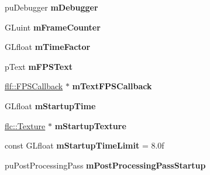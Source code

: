 \begin{DoxyCompactItemize}
\item 
pu\+Debugger {\bfseries m\+Debugger}\hypertarget{structflw_1_1Engine_1_1EngineImpl_af821555a9e1ba1352c6c9af5ba53c25d}{}\label{structflw_1_1Engine_1_1EngineImpl_af821555a9e1ba1352c6c9af5ba53c25d}

\item 
G\+Luint {\bfseries m\+Frame\+Counter}\hypertarget{structflw_1_1Engine_1_1EngineImpl_a9c92e97d68999058251d34739f0f8d61}{}\label{structflw_1_1Engine_1_1EngineImpl_a9c92e97d68999058251d34739f0f8d61}

\item 
G\+Lfloat {\bfseries m\+Time\+Factor}\hypertarget{structflw_1_1Engine_1_1EngineImpl_aa7597dc69e422afb55320a96721cd373}{}\label{structflw_1_1Engine_1_1EngineImpl_aa7597dc69e422afb55320a96721cd373}

\item 
p\+Text {\bfseries m\+F\+P\+S\+Text}\hypertarget{structflw_1_1Engine_1_1EngineImpl_a9bf706002acb60b0a814703f76b34f7c}{}\label{structflw_1_1Engine_1_1EngineImpl_a9bf706002acb60b0a814703f76b34f7c}

\item 
\hyperlink{classflw_1_1flf_1_1FPSCallback}{flf\+::\+F\+P\+S\+Callback} $\ast$ {\bfseries m\+Text\+F\+P\+S\+Callback}\hypertarget{structflw_1_1Engine_1_1EngineImpl_a77b606e9f63af6202f74b1f02f90a8ee}{}\label{structflw_1_1Engine_1_1EngineImpl_a77b606e9f63af6202f74b1f02f90a8ee}

\item 
G\+Lfloat {\bfseries m\+Startup\+Time}\hypertarget{structflw_1_1Engine_1_1EngineImpl_a35a75d539b91516903430800c785fb6d}{}\label{structflw_1_1Engine_1_1EngineImpl_a35a75d539b91516903430800c785fb6d}

\item 
\hyperlink{classflw_1_1flc_1_1Texture}{flc\+::\+Texture} $\ast$ {\bfseries m\+Startup\+Texture}\hypertarget{structflw_1_1Engine_1_1EngineImpl_a91572207ce28aece4512bea9b5fd4255}{}\label{structflw_1_1Engine_1_1EngineImpl_a91572207ce28aece4512bea9b5fd4255}

\item 
const G\+Lfloat {\bfseries m\+Startup\+Time\+Limit} = 8.\+0f\hypertarget{structflw_1_1Engine_1_1EngineImpl_aec65b0b92c90bfa4d02ab7209f705c07}{}\label{structflw_1_1Engine_1_1EngineImpl_aec65b0b92c90bfa4d02ab7209f705c07}

\item 
pu\+Post\+Processing\+Pass {\bfseries m\+Post\+Processing\+Pass\+Startup}\hypertarget{structflw_1_1Engine_1_1EngineImpl_a0335d7d2c148ddb43fbbdb2f9edd37d1}{}\label{structflw_1_1Engine_1_1EngineImpl_a0335d7d2c148ddb43fbbdb2f9edd37d1}


\end{DoxyCompactItemize}
